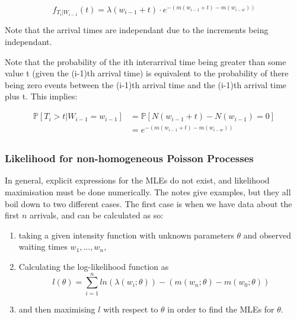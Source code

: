 \documentclass[12pt]{article}
\begin{document}
    \begin{equation*}
        f_{T_i | W_{i-1}}(t) = 
        \lambda(w_{i-1} + t) \cdot e^{-\left(m(w_{i-1} + t) - m(w_{i-w})\right)}
    \end{equation*}

    Note that the arrival times are independant due to the increments being independant. \newline \newline

    Note that the probability of the ith interarrival time being greater than some value t (given 
    the (i-1)th arrival time) is equivalent to the probability of there being zero events between 
    the (i-1)th arrival time and the (i-1)th arrival time plus t. This implies:

    \begin{equation*}
        \begin{aligned}
            \mathbb{P}[T_i > t | W_{i-1} = w_{i-1}] &= \mathbb{P}[N(w_{i-1} + t) - N(w_{i-1}) = 0] \\
                                                    &=  e^{-\left(m(w_{i-1} + t) - m(w_{i-w})\right)} \\
        \end{aligned}
    \end{equation*}
    \subsubsection{Likelihood for non-homogeneous Poisson Processes}
    In general, explicit expressions for the MLEs do not exist, and likelihood maximisation must be 
    done numerically.
    The notes give examples, but they all boil down to two different cases. The first case is when we have data about the first \(n\) arrivals, and can be calculated as so:
    \begin{enumerate}
        \item taking a given intensity function with unknown parameters \(\theta\) and observed waiting times \(w_1, \dots, w_n\),
        \item Calculating the log-likelihood function as 
            \begin{equation*}
                l(\theta) = \sum_{i=1}^{n}ln\left(\lambda(w_i; \theta)\right) - 
                \left(m(w_n; \theta) - m(w_0; \theta)\right)
            \end{equation*}
        \item and then maximising \(l\) with respect to \(\theta\) in order to find the MLEs for \(\theta\).
    \end{enumerate}
\end{document}
